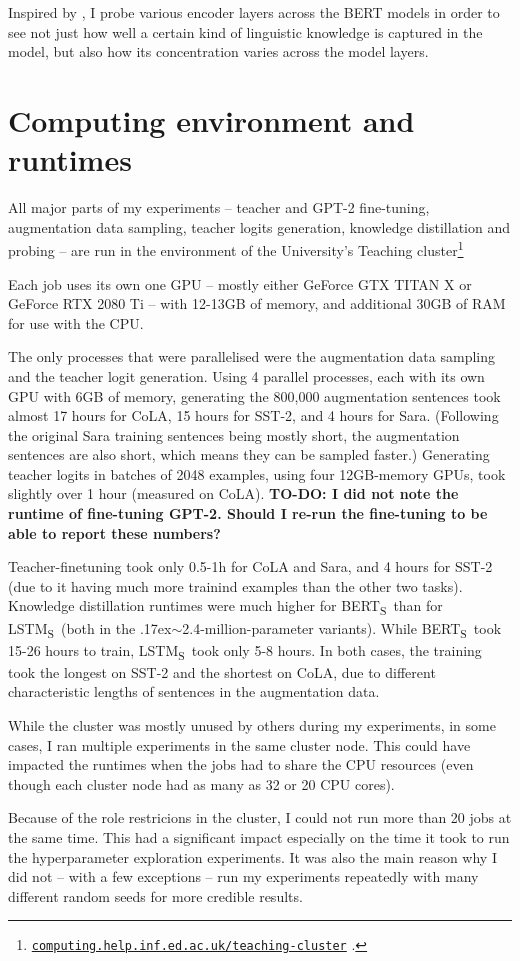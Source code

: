 \documentclass[bsc,frontabs,twoside,singlespacing,parskip,deptreport]{infthesis}
\def\mytilde{{\raise.17ex\hbox{$\scriptstyle\sim$}}}
\def\BERTS{BERT\textsubscript{S}}
\def\LSTMS{LSTM\textsubscript{S}}
\newcommand\rurl[1]{%
  \href{https://#1}{\nolinkurl{#1}}%
}
\begin{document}
{{{      Inspired by \citet{Tenney_2019b}, I probe various encoder layers across the BERT models in order to see not just how well a certain kind of linguistic knowledge is captured in the model, but also how its concentration varies across the model layers.
    }
  }

  \section{Computing environment and runtimes}{
    All major parts of my experiments -- teacher and GPT-2 fine-tuning, augmentation data sampling, teacher logits generation, knowledge distillation and probing -- are run in the environment of the University's Teaching cluster\footnote{\rurl{computing.help.inf.ed.ac.uk/teaching-cluster}.}

    Each job uses its own one GPU -- mostly either GeForce GTX TITAN X or GeForce RTX 2080 Ti -- with 12-13GB of memory, and additional 30GB of RAM for use with the CPU.

    The only processes that were parallelised were the augmentation data sampling and the teacher logit generation. Using 4 parallel processes, each with its own GPU with 6GB of memory, generating the 800,000 augmentation sentences took almost 17 hours for CoLA, 15 hours for SST-2, and 4 hours for Sara. (Following the original Sara training sentences being mostly short, the augmentation sentences are also short, which means they can be sampled faster.) Generating teacher logits in batches of 2048 examples, using four 12GB-memory GPUs, took slightly over 1 hour (measured on CoLA).
    \textbf{TO-DO: I did not note the runtime of fine-tuning GPT-2. Should I re-run the fine-tuning to be able to report these numbers?}

    Teacher-finetuning took only 0.5-1h for CoLA and Sara, and 4 hours for SST-2 (due to it having much more trainind examples than the other two tasks). Knowledge distillation runtimes were much higher for \BERTS~than for \LSTMS~(both in the \mytilde2.4-million-parameter variants). While \BERTS~took 15-26 hours to train, \LSTMS~took only 5-8 hours. In both cases, the training took the longest on SST-2 and the shortest on CoLA, due to different characteristic lengths of sentences in the augmentation data.

    While the cluster was mostly unused by others during my experiments, in some cases, I ran multiple experiments in the same cluster node. This could have impacted the runtimes when the jobs had to share the CPU resources (even though each cluster node had as many as 32 or 20 CPU cores).

    Because of the role restricions in the cluster, I could not run more than 20 jobs at the same time. This had a significant impact especially on the time it took to run the hyperparameter exploration experiments. It was also the main reason why I did not -- with a few exceptions -- run my experiments repeatedly with many different random seeds for more credible results. 
  }
}
\end{document}
